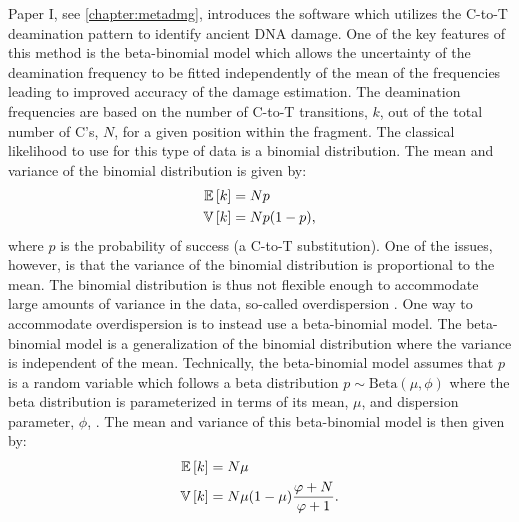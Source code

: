 Paper I, see \autoref{chapter:metadmg}, introduces the \metaDMG software which utilizes the C-to-T deamination pattern to identify ancient DNA damage. One of the key features of this method is the beta-binomial model which allows the uncertainty of the deamination frequency to be fitted independently of the mean of the frequencies leading to improved accuracy of the damage estimation. The deamination frequencies are based on the number of C-to-T transitions, $k$, out of the total number of C's, $N$, for a given position within the fragment. The classical likelihood to use for this type of data is a binomial distribution. The mean and variance of the binomial distribution is given by:
\begin{equation}
    \begin{split}
        \mathbb{E}\left[{k}\right]  &= N p \\
        \mathbb{V}\left[{k}\right] &= Np(1-p),
        \label{eq:Binomial_expectation_variance}
    \end{split}
\end{equation}
where $p$ is the probability of success (a C-to-T substitution). One of the issues, however, is that the variance of the binomial distribution is proportional to the mean. The binomial distribution is thus not flexible enough to accommodate large amounts of variance in the data, so-called overdispersion \autocite{mcelreathStatisticalRethinkingBayesian2020}. One way to accommodate overdispersion is to instead use a beta-binomial model. The beta-binomial model is a generalization of the binomial distribution where the variance is independent of the mean. Technically, the beta-binomial model assumes that $p$ is a random variable which follows a beta distribution $p \sim \mathrm{Beta}(\mu, \phi)$ where the beta distribution is parameterized in terms of its mean, $\mu$, and dispersion parameter, $\phi$, \autocite{cepeda-cuervoDoubleGeneralizedBetaBinomial2017}. The mean and variance of this beta-binomial model is then given by:
\begin{equation}
    \begin{split}
        \mathbb{E}\left[{k}\right]  &= N \mu \\
        \mathbb{V}\left[{k}\right] &= N\mu(1-\mu) \frac{\varphi+N}{\varphi+1}.
        \label{eq:BetaBinomial_expectation_variance}
    \end{split}
\end{equation}

